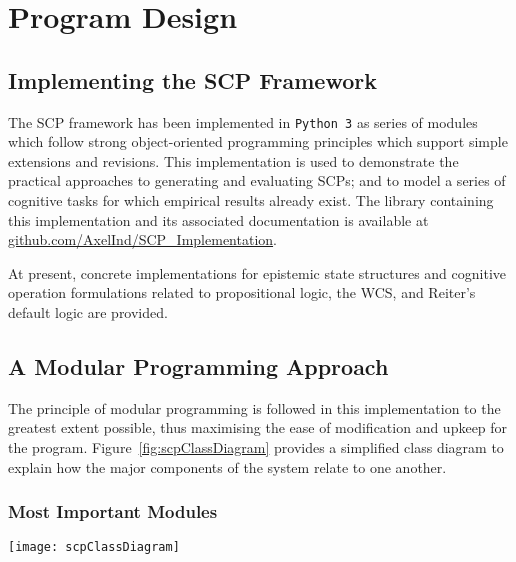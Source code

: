 \chapter{Program Design} \label{chp:program}
\section{Implementing the SCP Framework}

The SCP framework has been implemented in \texttt{Python 3} as series of modules which follow strong object-oriented programming principles which support simple extensions and revisions. This implementation is used to demonstrate the practical approaches to generating and evaluating SCPs; and to model a series of cognitive tasks for which empirical results already exist. The library containing this implementation and its associated documentation is available at \href{https://github.com/AxelInd/SCP_Implementation}{github.com/AxelInd/SCP\_Implementation}.

At present, concrete implementations for epistemic state structures and cognitive operation formulations related to propositional logic, the WCS, and Reiter's default logic are provided.

\section{A Modular Programming Approach}
The principle of modular programming is followed in this implementation to the greatest extent possible, thus maximising the ease of modification and upkeep for the program. Figure~\ref{fig:scpClassDiagram} provides a simplified class diagram to explain how the major components of the system relate to one another.

\subsection{Most Important Modules}


\begin{sidewaysfigure}
\centering \texttt{[image: scpClassDiagram]}
\caption{Class diagram for the implementation of the SCP Framework.}
\label{fig:scpClassDiagram}
\end{sidewaysfigure}


